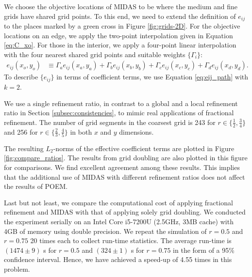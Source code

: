 We choose the objective locations of MIDAS to be where the medium and fine grids have shared grid points. To this end, we need to extend the definition of $e_{ij}$ to the places marked by a green cross in Figure \ref{fig:grids-2D}. For the objective locations on an edge, we apply the two-point interpolation given in Equation \ref{eq:C_xo}. For those in the interior, we apply a four-point linear interpolation with the four nearest shared grid points and suitable weights $\{\Gamma_i\}$:
\begin{align}
    e_{ij}(x_o,y_o) &\equiv \Gamma_{a}e_{ij}(x_a,y_a) + \Gamma_{b}e_{ij}(x_b,y_b) + \Gamma_{c}e_{ij}(x_c,y_c) + \Gamma_{d}e_{ij}(x_d,y_d).
\end{align}
To describe $\{e_{ij}\}$ in terms of coefficient terms, we use Equation \ref{eq:eij_path} with $k=2$.

We use a single refinement ratio, in contrast to a global and a local refinement ratio in Section \ref{subsec:consistencies}, to mimic real applications of fractional refinement. The number of grid segments in the coarsest grid is 243 for $r \in \{\frac{1}{2}, \frac{3}{4}\}$ and 256 for $r \in \{\frac{2}{3}, \frac{4}{5}\}$ in both $x$ and $y$ dimensions.

The resulting $L_2$-norms of the effective coefficient terms are plotted in Figure \ref{fig:compare_ratios}. The results from grid doubling are also plotted in this figure for comparisons. We find excellent agreement among these results. This implies that the additional use of MIDAS with different refinement ratios does not affect the results of POEM.

Last but not least, we compare the computational cost of applying fractional refinement and MIDAS with that of applying solely grid doubling. We conducted the experiment serially on an Intel Core i5-7200U (2.5GHz, 3MB cache) with 4GB of memory using double precision. We repeat the simulation of $r=0.5$ and $r=0.75$ 20 times each to collect run-time statistics. The average run-time is $(1474 \pm 9)$ s for $r=0.5$ and $(324 \pm 1)$ s for $r=0.75$ in the form of a 95\% confidence interval. Hence, we have achieved a speed-up of 4.55 times in this problem.


\FloatBarrier